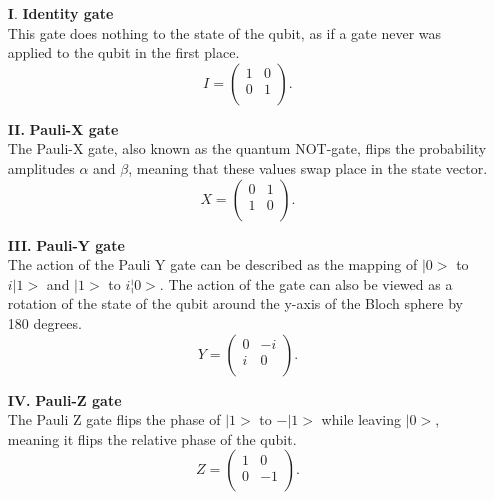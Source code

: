 \documentclass[onecolumn,10pt,cleanfoot]{asme2ej}
\begin{document}
\begin{enumerate}
	\item[\textbf{I}.] \textbf{Identity gate} \\
		This gate does nothing to the state of the qubit, as if a gate never was applied to the qubit in the first place.
		\begin{equation*}
			I = \begin{pmatrix}
			1 & 0 \\
			0 & 1 \\
		\end{pmatrix}.
	\end{equation*}

	\item[\textbf{II.}] \textbf{Pauli-X gate} \\
		The Pauli-X gate, also known as the quantum NOT-gate, flips the probability amplitudes $\alpha$ and $\beta$, meaning that these values swap place in the state vector. 
		\begin{equation*}
			X = \begin{pmatrix}
			0 & 1 \\
			1 & 0 \\
		\end{pmatrix}.
	\end{equation*}

	\item[\textbf{III.}] \textbf{Pauli-Y gate} \\
		The action of the Pauli Y gate can be described as the mapping of $|0>$ to $i|1>$ and $|1>$ to $i¦0>$. The action of the gate can also be viewed as a rotation of the state of the qubit around the y-axis of the Bloch sphere by 180 degrees.
		\begin{equation*}
			Y = \begin{pmatrix}
			0 & -i \\
			i & 0 \\
		\end{pmatrix}.
	\end{equation*}

	\item[\textbf{IV.}] \textbf{Pauli-Z gate} \\
		The Pauli Z gate flips the phase of $|1>$ to $-|1>$ while leaving $|0>$, meaning it flips the relative phase of the qubit. 
		\begin{equation*}
			Z = \begin{pmatrix}
			1 & 0 \\
			0 & -1 \\
		\end{pmatrix}.
	\end{equation*}


\end{enumerate}
\end{document}

